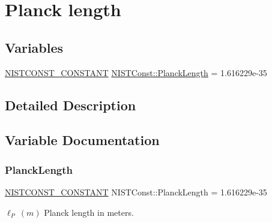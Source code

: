 \hypertarget{group___n_i_s_t_const-_planck_length}{}\section{Planck length}
\label{group___n_i_s_t_const-_planck_length}
\subsection*{Variables}
\begin{DoxyCompactItemize}
\item 
\mbox{\hyperlink{group___n_i_s_t_const-_macros_ga2b0fc1d7452373f816175dd86ce26729}{N\+I\+S\+T\+C\+O\+N\+S\+T\+\_\+\+C\+O\+N\+S\+T\+A\+NT}} \mbox{\hyperlink{group___n_i_s_t_const-_planck_length_ga2e9817f37b39c109d5a1e69596e467e7}{N\+I\+S\+T\+Const\+::\+Planck\+Length}} = 1.\+616229e-\/35
\end{DoxyCompactItemize}


\subsection{Detailed Description}


\subsection{Variable Documentation}
\mbox{\label{group___n_i_s_t_const-_planck_length_ga2e9817f37b39c109d5a1e69596e467e7}} 
\subsubsection{\texorpdfstring{Planck\+Length}{PlanckLength}}
{\footnotesize\ttfamily \mbox{\hyperlink{group___n_i_s_t_const-_macros_ga2b0fc1d7452373f816175dd86ce26729}{N\+I\+S\+T\+C\+O\+N\+S\+T\+\_\+\+C\+O\+N\+S\+T\+A\+NT}} N\+I\+S\+T\+Const\+::\+Planck\+Length = 1.\+616229e-\/35}

$\ell_P \ (m)$ Planck length in meters. 